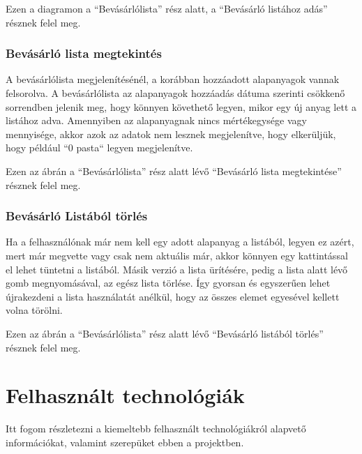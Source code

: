 \documentclass[12pt]{report}
\theoremstyle{definition}
\begin{document}
Ezen a diagramon a “Bevásárlólista” rész alatt, a “Bevásárló listához adás” résznek felel meg.

\subsection{Bevásárló lista megtekintés}
A bevásárlólista megjelenítésénél, a korábban hozzáadott alapanyagok vannak felsorolva. A bevásárlólista az alapanyagok hozzáadás dátuma szerinti csökkenő sorrendben jelenik meg, hogy könnyen követhető legyen, mikor egy új anyag lett a listához adva. Amennyiben az alapanyagnak nincs mértékegysége vagy mennyisége, akkor azok az adatok nem lesznek megjelenítve, hogy elkerüljük, hogy például “0 pasta“ legyen megjelenítve.

Ezen az ábrán a “Bevásárlólista” rész alatt lévő “Bevásárló lista megtekintése” résznek felel meg.


\subsection{Bevásárló Listából törlés}
Ha a felhasználónak már nem kell egy adott alapanyag a listából, legyen ez azért, mert már megvette vagy csak nem aktuális már, akkor könnyen egy kattintással el lehet tüntetni a listából. Másik verzió a lista ürítésére, pedig a lista alatt lévő gomb megnyomásával, az egész lista törlése. Így gyorsan és egyszerűen lehet újrakezdeni a lista használatát anélkül, hogy az összes elemet egyesével kellett volna törölni.

Ezen az ábrán a “Bevásárlólista” rész alatt lévő “Bevásárló listából törlés” résznek felel meg.







\chapter{Felhasznált technológiák}
Itt fogom részletezni a kiemeltebb felhasznált technológiákról alapvető információkat, valamint szerepüket ebben a projektben.
\end{document}
